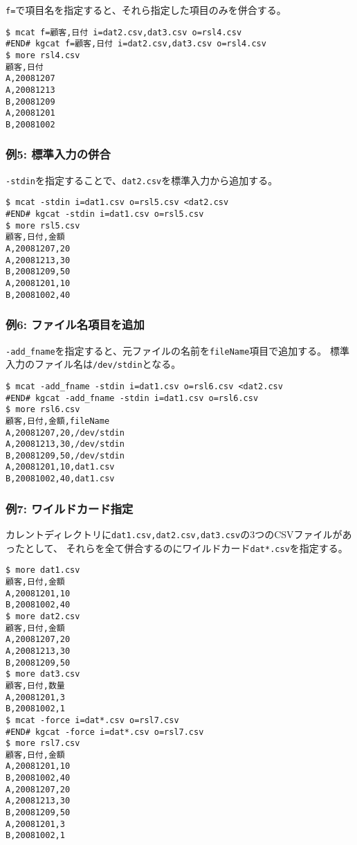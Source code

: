 \verb|f=|で項目名を指定すると、それら指定した項目のみを併合する。


\begin{Verbatim}[baselinestretch=0.7,frame=single]
$ mcat f=顧客,日付 i=dat2.csv,dat3.csv o=rsl4.csv
#END# kgcat f=顧客,日付 i=dat2.csv,dat3.csv o=rsl4.csv
$ more rsl4.csv
顧客,日付
A,20081207
A,20081213
B,20081209
A,20081201
B,20081002
\end{Verbatim}
\subsubsection*{例5: 標準入力の併合}

\verb|-stdin|を指定することで、\verb|dat2.csv|を標準入力から追加する。


\begin{Verbatim}[baselinestretch=0.7,frame=single]
$ mcat -stdin i=dat1.csv o=rsl5.csv <dat2.csv
#END# kgcat -stdin i=dat1.csv o=rsl5.csv
$ more rsl5.csv
顧客,日付,金額
A,20081207,20
A,20081213,30
B,20081209,50
A,20081201,10
B,20081002,40
\end{Verbatim}
\subsubsection*{例6: ファイル名項目を追加}

\verb|-add_fname|を指定すると、元ファイルの名前を\verb|fileName|項目で追加する。
標準入力のファイル名は\verb|/dev/stdin|となる。


\begin{Verbatim}[baselinestretch=0.7,frame=single]
$ mcat -add_fname -stdin i=dat1.csv o=rsl6.csv <dat2.csv
#END# kgcat -add_fname -stdin i=dat1.csv o=rsl6.csv
$ more rsl6.csv
顧客,日付,金額,fileName
A,20081207,20,/dev/stdin
A,20081213,30,/dev/stdin
B,20081209,50,/dev/stdin
A,20081201,10,dat1.csv
B,20081002,40,dat1.csv
\end{Verbatim}
\subsubsection*{例7: ワイルドカード指定}

カレントディレクトリに\verb|dat1.csv,dat2.csv,dat3.csv|の3つのCSVファイルがあったとして、
それらを全て併合するのにワイルドカード\verb|dat*.csv|を指定する。


\begin{Verbatim}[baselinestretch=0.7,frame=single]
$ more dat1.csv
顧客,日付,金額
A,20081201,10
B,20081002,40
$ more dat2.csv
顧客,日付,金額
A,20081207,20
A,20081213,30
B,20081209,50
$ more dat3.csv
顧客,日付,数量
A,20081201,3
B,20081002,1
$ mcat -force i=dat*.csv o=rsl7.csv
#END# kgcat -force i=dat*.csv o=rsl7.csv
$ more rsl7.csv
顧客,日付,金額
A,20081201,10
B,20081002,40
A,20081207,20
A,20081213,30
B,20081209,50
A,20081201,3
B,20081002,1
\end{Verbatim}
